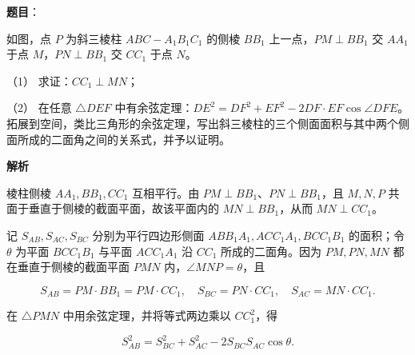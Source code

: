 \begin{answer}

\textbf{题目}：

如图，点 $P$ 为斜三棱柱 $ABC-A_1B_1C_1$ 的侧棱 $BB_1$ 上一点，$PM\perp BB_1$ 交 $AA_1$ 于点 $M$，$PN\perp BB_1$ 交 $CC_1$ 于点 $N$。

（1） 求证：$CC_1\perp MN$；

（2） 在任意 $\triangle DEF$ 中有余弦定理：$DE^2=DF^2+EF^2-2DF\cdot EF\cos\angle DFE$。拓展到空间，类比三角形的余弦定理，写出斜三棱柱的三个侧面面积与其中两个侧面所成的二面角之间的关系式，并予以证明。
\nopagebreak[4]
\begin{center}\end{center}
\nopagebreak[4]
\textbf{解析}


棱柱侧棱 $AA_1,BB_1,CC_1$ 互相平行。由 $PM\perp BB_1$、$PN\perp BB_1$，且 $M,N,P$ 共面于垂直于侧棱的截面平面，故该平面内的 $MN\perp BB_1$，从而 $MN\perp CC_1$。


记 $S_{AB},S_{AC},S_{BC}$ 分别为平行四边形侧面 $ABB_1A_1,ACC_1A_1,BCC_1B_1$ 的面积；令 $\theta$ 为平面 $BCC_1B_1$ 与平面 $ACC_1A_1$ 沿 $CC_1$ 所成的二面角。因为 $PM,PN,MN$ 都在垂直于侧棱的截面平面 $PMN$ 内，$\angle MNP=\theta$，且

\nopagebreak[4]
\[S_{AB}=PM\cdot BB_1=PM\cdot CC_1,\quad S_{BC}=PN\cdot CC_1,\quad S_{AC}=MN\cdot CC_1.\]

在 $\triangle PMN$ 中用余弦定理，并将等式两边乘以 $CC_1^2$，得

\nopagebreak[4]
\[S_{AB}^2=S_{BC}^2+S_{AC}^2-2S_{BC}S_{AC}\cos\theta.\]



\end{answer}
